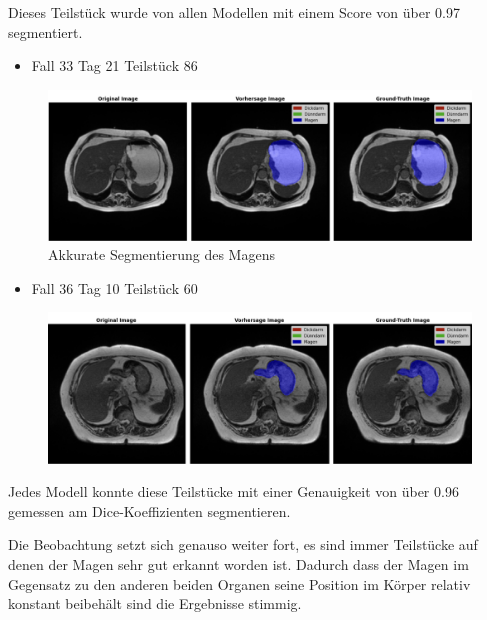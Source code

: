 Dieses Teilstück wurde von allen Modellen mit einem Score von über 0.97 segmentiert. 

\begin{itemize}
\item Fall 33 Tag 21 Teilstück 86
\end{itemize}

\begin{figure}[H]
	\begin{center}
		\includegraphics[width=400pt]{LaTex/bilder/case33_day21_slice_0086.png}
		\caption{ Akkurate Segmentierung des Magens }\label{Fig:7vs1}
	\end{center}
\end{figure}

\pagebreak

\begin{itemize}
\item Fall 36 Tag 10 Teilstück 60
\end{itemize}

\begin{figure}[H]
	\begin{center}
		\includegraphics[width=400pt]{LaTex/bilder/case36_day10_slice_0060.png}
		\caption{  }\label{Fig:7vs1}
	\end{center}
\end{figure}

Jedes Modell konnte diese Teilstücke mit einer Genauigkeit von über 0.96 gemessen am Dice-Koeffizienten segmentieren.

Die Beobachtung setzt sich genauso weiter fort, es sind immer Teilstücke auf denen der Magen sehr gut erkannt worden ist. Dadurch dass der Magen im Gegensatz zu den anderen beiden Organen seine Position im Körper relativ konstant beibehält sind die Ergebnisse stimmig.

